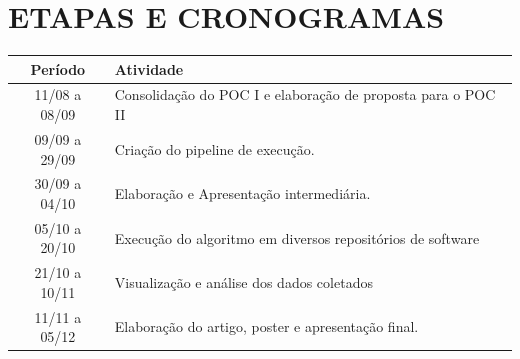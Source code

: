 \documentclass{abnt}
\begin{document}
\chapter{ETAPAS E CRONOGRAMAS}

\begin{table}[ht]
  \centering
  \label{tab:Table1}
  \smallskip
  \begin{tabular}{cp{11cm}}
  Período & Atividade\\[0.5ex]
  \hline
  11/08 a 08/09 & Consolidação do POC I e elaboração de proposta para o POC II \\[0.5ex]

  09/09 a 29/09 & Criação do pipeline de execução.\\[0.5ex]
  
  30/09 a 04/10 & Elaboração e Apresentação intermediária. \\[0.5ex]

  05/10 a 20/10 & Execução do algoritmo em diversos repositórios de software  \\[0.5ex]

  21/10 a 10/11 & Visualização e análise dos dados coletados \\[0.5ex]

  11/11 a 05/12 & Elaboração do artigo, poster e apresentação final. \\[0.5ex]
  \end{tabular}
  \end{table}


\end{document}
